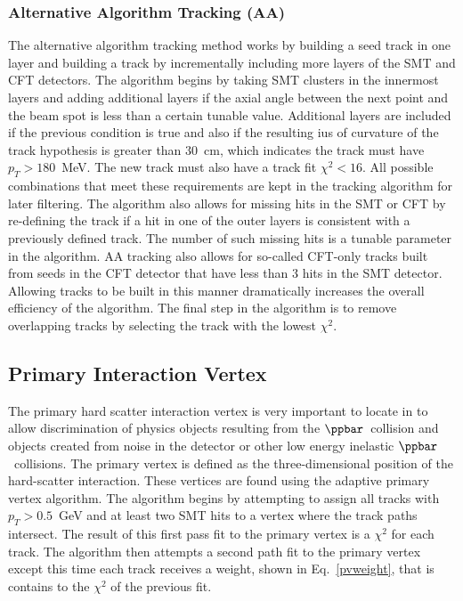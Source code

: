 \subsubsection{Alternative Algorithm Tracking (AA)}
\label{aa}
The alternative algorithm tracking method works by building a seed track in one layer and building a track by incrementally including more layers of the SMT and CFT detectors. The algorithm begins by taking SMT clusters in the innermost layers and adding additional layers if the axial angle between the next point and the beam spot is less than a certain tunable value. Additional layers are included if the previous condition is true and also if the resulting ius of curvature of the track hypothesis is greater than $30$~cm, which indicates the track must have $p_{T}>180$~MeV. The new track must also have a track fit $\chi^{2}<16$. All possible combinations that meet these requirements are kept in the tracking algorithm for later filtering. The algorithm also allows for missing hits in the SMT or CFT by re-defining the track if a hit in one of the outer layers is consistent with a previously defined track. The number of such missing hits is a tunable parameter in the algorithm. AA tracking also allows for so-called CFT-only tracks built from seeds in the CFT detector that have less than 3 hits in the SMT detector. Allowing tracks to be built in this manner dramatically increases the overall efficiency of the algorithm. The final step in the algorithm is to remove overlapping tracks by selecting the track with the lowest $\chi^{2}$.


\subsection{Primary Interaction Vertex}
\label{pvreco}
The primary hard scatter interaction vertex is very important to locate in to allow discrimination of physics objects resulting from the $\ppbar$~collision and objects created from noise in the detector or other low energy inelastic $\ppbar$~collisions. The primary vertex is defined as the three-dimensional position of the hard-scatter interaction. These vertices are found using the adaptive primary vertex algorithm. The algorithm begins by attempting to assign all tracks with $p_{T}>0.5$~GeV and at least two SMT hits to a vertex where the track paths intersect. The result of this first pass fit to the primary vertex is a $\chi^{2}$ for each track. The algorithm then attempts a second path fit to the primary vertex except this time each track receives a weight, shown in Eq.~\ref{pvweight}, that is contains to the $\chi^{2}$ of the previous fit.

